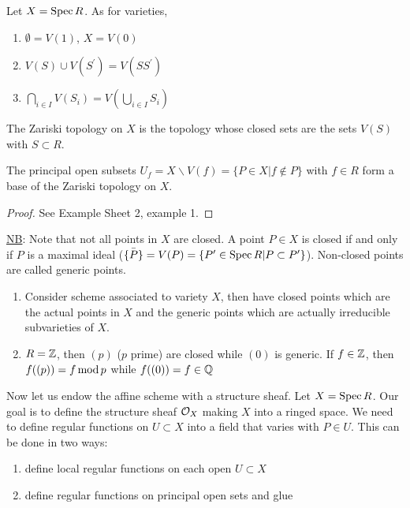 \documentclass[a4paper,11pt]{article}
\begin{document}
			Let $X=\operatorname{Spec} R$. As for varieties,
			\begin{enumerate}
				\item $\emptyset=V(1)$, $X=V(0)$
				\item $V(S)\cup V(S^\prime)=V(SS^\prime)$
				\item $\bigcap_{i\in I}V(S_i)=V(\bigcup_{i\in I}S_i)$
			\end{enumerate}

			\begin{defi}
				The Zariski topology on $X$ is the topology whose closed sets are the sets $V(S)$ with $S\subset R$.
			\end{defi}

			\begin{prop}
				The principal open subsets $U_f=X\backslash V(f)=\{P\in X|f\notin P\}$ with $f\in R$ form a base of the Zariski topology on $X$.
			\end{prop}
			\begin{proof}
				See Example Sheet 2, example 1.
			\end{proof}

			\noindent\underline{NB}: Note that not all points in $X$ are closed. A point $P\in X$ is closed if and only if $P $ is a maximal ideal ($\bar{\{P\}}=V(P)=\{P^\prime\in\operatorname{Spec} R|P\subset P^\prime\}$). Non-closed points are called generic points.

			\begin{eg}
				
				\begin{enumerate}
					\item Consider scheme associated to variety $X$, then have closed points which are the actual points in $X$ and the generic points which are actually irreducible subvarieties of $X$.
					\item $R=\mathbb{Z}$, then $(p)$ ($p$ prime) are closed while $(0)$ is generic. If $f\in\mathbb{Z}$, then $f((p))=f\operatorname{mod} p$ while $f((0))=f\in\mathbb{Q}$ 
				\end{enumerate}
			\end{eg}

			Now let us endow the affine scheme with a structure sheaf.
			Let $X=\operatorname{Spec} R$. Our goal is to define the structure sheaf $\mathcal{O}_X$ making $X$ into a ringed space. We need to define regular functions on $U\subset X$ into a field that varies with $P\in U$. This can be done in two ways:
			\begin{enumerate}
				\item define local regular functions on each open $U\subset X$
				\item define regular functions on principal open sets and glue
			\end{enumerate}
\end{document}
